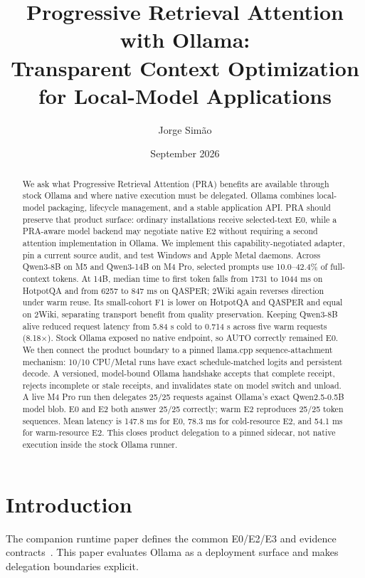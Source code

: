 \documentclass[10pt]{article}
\title{Progressive Retrieval Attention with Ollama:\\
Transparent Context Optimization for Local-Model Applications}
\author{Jorge Sim\~ao}
\date{September 2026}
\begin{document}
\maketitle

\begin{abstract}
We ask what Progressive Retrieval Attention (PRA) benefits are available
through stock Ollama and where native execution must be delegated. Ollama
combines local-model packaging, lifecycle management, and a stable application
API. PRA should preserve that
product surface: ordinary installations receive selected-text E0, while a
PRA-aware model backend may negotiate native E2 without requiring a second
attention implementation in Ollama. We implement this capability-negotiated
adapter, pin a current source audit, and test Windows and Apple Metal daemons.
Across Qwen3-8B on M5 and Qwen3-14B on M4 Pro, selected prompts use
10.0--42.4\% of full-context tokens. At 14B, median time to first token falls
from 1731 to 1044 ms on HotpotQA and from 6257 to 847 ms on QASPER; 2Wiki again
reverses direction under warm reuse. Its small-cohort F1 is lower on HotpotQA
and QASPER and equal on 2Wiki, separating transport benefit from quality
preservation. Keeping Qwen3-8B alive reduced request latency from 5.84 s cold
to 0.714 s across five warm requests (8.18$\times$). Stock Ollama exposed no
native endpoint, so AUTO correctly remained E0. We then connect the product
boundary to a pinned llama.cpp sequence-attachment mechanism: 10/10 CPU/Metal
runs have exact schedule-matched logits and persistent decode. A versioned,
  model-bound Ollama handshake accepts that complete receipt, rejects incomplete
  or stale receipts, and invalidates state on model switch and unload. A live
  M4 Pro run then delegates 25/25 requests against Ollama's exact Qwen2.5-0.5B
  model blob. E0 and E2 both answer 25/25 correctly; warm E2 reproduces 25/25
  token sequences. Mean latency is 147.8 ms for E0, 78.3 ms for cold-resource E2,
  and 54.1 ms for warm-resource E2. This closes product delegation to a pinned
  sidecar, not native execution inside the stock Ollama runner.
\end{abstract}

\section{Introduction}
The companion runtime paper defines the common E0/E2/E3 and evidence
contracts~\cite{praruntime}. This paper evaluates Ollama as a deployment
surface and makes delegation boundaries explicit.
\end{document}
